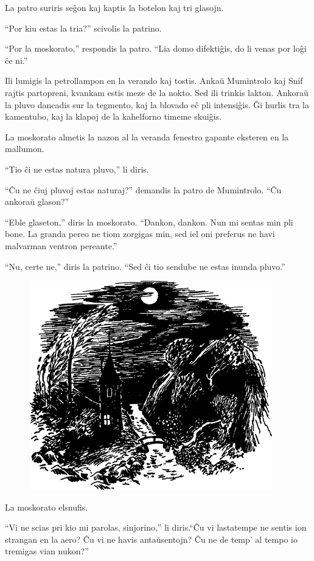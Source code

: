 La patro suriris seĝon kaj kaptis la botelon kaj tri glasojn.

``Por kiu estas la tria?'' scivolis la patrino.

``Por la moskorato,'' respondis la patro. ``Lia domo difektiĝis, do li venas por loĝi ĉe ni.''

Ili lumigis la petrollampon en la verando kaj tostis. Ankaŭ Mumintrolo kaj Snif rajtis partopreni, kvankam estis meze de la nokto. Sed ili trinkis lakton. Ankoraŭ la pluvo dancadis sur la tegmento, kaj la blovado eĉ pli intensiĝis. Ĝi hurlis tra la kamentubo, kaj la klapoj de la kahelforno timeme skuiĝis.

La moskorato almetis la nazon al la veranda fenestro gapante eksteren en la mallumon.

``Tio ĉi ne estas natura pluvo,'' li diris.

``Ĉu ne ĉiuj pluvoj estas naturaj?'' demandis la patro de Mumintrolo. ``Ĉu ankoraŭ glason?''

``Eble glaseton,'' diris la moskorato. ``Dankon, dankon. Nun mi sentas min pli bone. La granda pereo ne tiom zorgigas min, sed iel oni preferus ne havi malvarman ventron pereante.''

``Nu, certe ne,'' diris la patrino. ``Sed ĉi tio sendube ne estas inunda pluvo.''

\begin{figure}[htbp]
\centering
\includegraphics[width=300pt,height=258pt]{1-12.png}
\caption{}
\label{1-12}
\end{figure}

La moskorato elsnufis.

``Vi ne scias pri kio mi parolas, sinjorino,'' li diris.``Ĉu vi lastatempe ne sentis ion strangan en la aero? Ĉu vi ne havis antaŭsentojn? Ĉu ne de temp' al tempo io tremigas vian nukon?''

